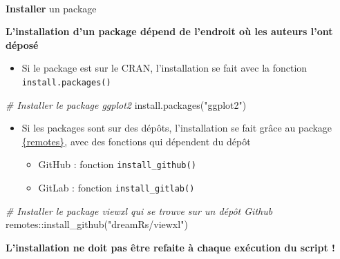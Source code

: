 \documentclass[
  french,
  10pt,
  a4paper,
]{article}
\makeatletter
\let\oldparagraph\paragraph
\renewcommand{\paragraph}{
    \@ifstar
      \xxxParagraphStar
      \xxxParagraphNoStar
  }
\newcommand{\xxxParagraphStar}[1]{\oldparagraph*{#1}\mbox{}}
\newcommand{\xxxParagraphNoStar}[1]{\oldparagraph{#1}\mbox{}}
\newenvironment{Shaded}{}{}
\newcommand{\CommentTok}[1]{\textcolor[rgb]{0.63,0.63,0.65}{\textit{#1}}}
\newcommand{\FunctionTok}[1]{\textcolor[rgb]{0.25,0.47,0.95}{#1}}
\newcommand{\NormalTok}[1]{\textcolor[rgb]{0.22,0.23,0.26}{#1}}
\newcommand{\SpecialCharTok}[1]{\textcolor[rgb]{0.00,0.52,0.74}{#1}}
\newcommand{\StringTok}[1]{\textcolor[rgb]{0.31,0.63,0.31}{#1}}
\providecommand{\tightlist}{%
  \setlength{\itemsep}{0pt}\setlength{\parskip}{0pt}}
\makeatother
\begin{document}
\paragraph{\texorpdfstring{\textbf{Installer} un
package}{Installer un package}}\label{installer-un-package}

\textbf{L'installation d'un package dépend de l'endroit où les auteurs
l'ont déposé}

\begin{itemize}
\tightlist
\item
  Si le package est sur le CRAN, l'installation se fait avec la fonction
  \texttt{install.packages()}
\end{itemize}

\begin{Shaded}
\begin{Highlighting}[]
\CommentTok{\# Installer le package ggplot2}
\FunctionTok{install.packages}\NormalTok{(}\StringTok{"ggplot2"}\NormalTok{)}
\end{Highlighting}
\end{Shaded}

\begin{itemize}
\item
  Si les packages sont sur des dépôts, l'installation se fait grâce au
  package \href{https://remotes.r-lib.org/}{{\{remotes\}}}, avec des
  fonctions qui dépendent du dépôt

  \begin{itemize}
  \tightlist
  \item
    GitHub : fonction \texttt{install\_github()}
  \item
    GitLab : fonction \texttt{install\_gitlab()}
  \end{itemize}
\end{itemize}

\begin{Shaded}
\begin{Highlighting}[]
\CommentTok{\# Installer le package viewxl qui se trouve sur un dépôt Github}
\NormalTok{remotes}\SpecialCharTok{::}\FunctionTok{install\_github}\NormalTok{(}\StringTok{"dreamRs/viewxl"}\NormalTok{)}
\end{Highlighting}
\end{Shaded}

\begin{tcolorbox}[enhanced jigsaw, arc=.35mm, bottomrule=.15mm, breakable, colback=white, colframe=quarto-callout-tip-color-frame, left=2mm, leftrule=.75mm, opacityback=0, rightrule=.15mm, toprule=.15mm]
\begin{minipage}[t]{5.5mm}
\textcolor{quarto-callout-tip-color}{\faLightbulb}
\end{minipage}%
\begin{minipage}[t]{\textwidth - 5.5mm}

\textbf{L'installation ne doit pas être refaite à chaque exécution du
script !}

\end{minipage}%
\end{tcolorbox}
\end{document}
